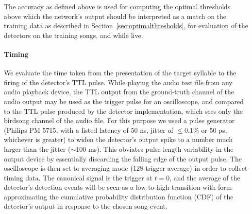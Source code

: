 \documentclass[10pt,letterpaper]{article}
\newcommand\sref[1]{Section~\ref{#1}}
\renewcommand{\subsubsection}[1]{\paragraph{#1}}
\newcommand\argmin{\mathop{\mbox{{\rm argmin}}}\limits}
\newcommand{\noprint}[1]{}
\begin{document}
The accuracy as defined above is used for computing the optimal thresholds above
which the network's output should be interpreted as a match on the
training data as described in \sref{sec:optimalthresholds}, for
evaluation of the detectors on the training songs,
and while live.

\noprint{
Since the network
will output values $o_t$ between 0 and 1 at each moment $t$ in an
attempt to match the training output, the optimal threshold
$\tau\in[0,1]$ for the output neuron should be computed.  Given the
relative cost of false positives vs.~false negatives $C$, and the
acceptable time difference between target syllable and correct output
$\Delta t_d$, we compute the optimal threshold for an output element
according to the definitions above:
\begin{eqnarray*}
  \mbox{true positives}_\tau &=& \mbox{size of set}_{s\in \mbox{target songs}} o_t > \tau, \left| t \leq \Delta t_d \right| \\
  \mbox{false negatives}_\tau &=& \mbox{size of set} {s\in\mbox{target songs}} - \mbox{size of set} \mbox{true positives} \\
  \mbox{false positives}_\tau &=& \mbox{size of set}_{s\in \mbox{target songs}} o_t > \tau, \left| t > \Delta t_d \right| \\
  \widehat{\tau} &=& \argmin_\tau C\mbox{false positive} + \mbox{false negatives}
\end{eqnarray*}
}

\subsubsection{Timing}


We evaluate the time taken from the presentation of the target
syllable to the firing of the detector's TTL pulse. While playing the
audio test file from any audio playback device, the TTL
output from the ground-truth channel of the audio output may be used
as the trigger pulse for an oscilloscope, and compared to the TTL pulse
produced by the detector implementation, which sees only the birdsong channel
of the audio file. For this purpose we used a pulse
generator (Philips PM 5715, with a listed latency of 50 ns, jitter 
of $\leq 0.1\%$ or 50 ps, whichever is greater) to widen the
detector's output spike to a number much larger than the jitter ($\sim 100$ ms).  This obviates pulse length variability in the output device by essentially discarding the falling edge of the output pulse.  The oscilloscope is then set to
averaging mode (128-trigger average) in order to collect timing data. The canonical signal is the trigger at $t=0$, and the
average of the detector's detection events will be seen as a
low-to-high transition with form approximating the cumulative
probability distribution function (CDF) of the detector's output in
response to the chosen song event.
\end{document}
